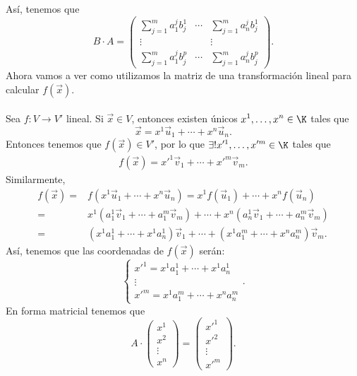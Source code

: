 Así, tenemos que
\[ B \cdot A = \begin{pmatrix} 
	\sum^{m}_{j=1}a^{j}_{1}b^{1}_{j} & \cdots & \sum^{m}_{j=1}a^{j}_{n}b^{1}_{j} \\
	\vdots & & \vdots \\
	\sum^{m}_{j=1}a^{j}_{1}b^{p}_{j} & \cdots & \sum^{m}_{j = 1}a_{n}^{j}b^{p}_{j}
\end{pmatrix} .\]
Ahora vamos a ver como utilizamos la matriz de una transformación lineal para calcular $\displaystyle f\left(\vec{x}\right) $.\\ \\
Sea $\displaystyle f : V \to V' $ lineal. Si $\displaystyle \vec{x} \in V $, entonces existen únicos $\displaystyle x^{1}, \ldots, x^{n} \in \K $ tales que 
\[\vec{x} = x^{1} \vec{u}_{1} + \cdots + x^{n}\vec{u}_{n} .\]
Entonces tenemos que $\displaystyle f\left(\vec{x}\right) \in V' $, por lo que $\displaystyle \exists! x'^{1}, \ldots, x'^{m} \in\K$ tales que
\[
\begin{split}
f\left(\vec{x}\right) = x'^{1}\vec{v}_{1} + \cdots + x'^{m}\vec{v}_{m}.
\end{split}
\]
Similarmente, 
\[
\begin{split}
	f\left(\vec{x}\right) = & f\left(x^{1}\vec{u}_{1} + \cdots + x^{n}\vec{u}_{n}\right) 
	=  x^{1}f\left(\vec{u}_{1}\right) + \cdots + x^{n}f\left(\vec{u}_{n}\right) \\
	= & x^{1}\left(a^{1}_{1}\vec{v}_{1} + \cdots + a^{m}_{1}\vec{v}_{m}\right) + \cdots + x^{n}\left(a^{1}_{n}\vec{v}_{1} + \cdots + a^{m}_{n}\vec{v}_{m}\right) \\
	= & \left(x^{1}a_{1}^{1} + \cdots + x^{1}a^{1}_{n}\right)\vec{v}_{1} + \cdots + \left(x^{1}a^{m}_{1} + \cdots + x^{n}a^{m}_{n}\right)\vec{v}_{m}.
\end{split}
\]
Así, tenemos que las coordenadas de $\displaystyle f\left(\vec{x}\right) $ serán:
\[
\begin{cases}
x'^{1} = x^{1}a^{1}_{1} + \cdots + x^{1}a^{1}_{n}\\
\vdots \\
x'^{m} = x^{1}a^{m}_{1} + \cdots + x^{n}a^{m}_{n}
\end{cases}
.\]
En forma matricial tenemos que
\[
	A \cdot \begin{pmatrix} x^{1} \\ x^{2} \\ \vdots \\ x^{n} \end{pmatrix} = \begin{pmatrix} x'^{1} \\ x'^{2} \\ \vdots \\ x'^{m} \end{pmatrix}
 .\]
